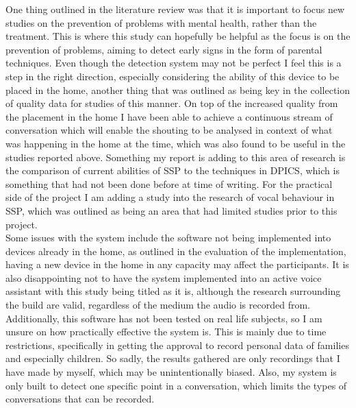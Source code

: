 \documentclass[a4paper,11pt]{report}
\begin{document}
One thing outlined in the literature review was that it is important to focus new studies on the prevention of problems with mental health, rather than the treatment. This is where this study can hopefully be helpful as the focus is on the prevention of problems, aiming to detect early signs in the form of parental techniques. Even though the detection system may not be perfect I feel this is a step in the right direction, especially considering the ability of this device to be placed in the home, another thing that was outlined as being key in the collection of quality data for studies of this manner. On top of the increased quality from the placement in the home I have been able to achieve a continuous stream of conversation which will enable the shouting to be analysed in context of what was happening in the home at the time, which was also found to be useful in the studies reported above. Something my report is adding to this area of research is the comparison of current abilities of SSP to the techniques in DPICS, which is something that had not been done before at time of writing. For the practical side of the project I am adding a study into the research of vocal behaviour in SSP, which was outlined as being an area that had limited studies prior to this project.  \\

Some issues with the system include the software not being implemented into devices already in the home, as outlined in the evaluation of the implementation, having a new device in the home in any capacity may affect the participants. It is also disappointing not to have the system implemented into an active voice assistant with this study being titled as it is, although the research surrounding the build are valid, regardless of the medium the audio is recorded from. Additionally, this software has not been tested on real life subjects, so I am unsure on how practically effective the system is. This is mainly due to time restrictions, specifically in getting the approval to record personal data of families and especially children. So sadly, the results gathered are only recordings that I have made by myself, which may be unintentionally biased. Also, my system is only built to detect one specific point in a conversation, which limits the types of conversations that can be recorded. 
\end{document}
